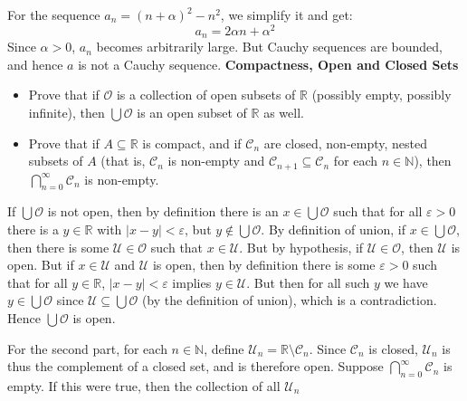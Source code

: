 \documentclass{article}
\begin{document}
    For the sequence $a_{n}=(n+\alpha)^{2}-n^{2}$, we simplify it and get:
    \begin{equation}
        a_{n}
        =
        2\alpha{n}+\alpha^{2}
    \end{equation}
    Since $\alpha>0$, $a_{n}$ becomes arbitrarily large. But Cauchy sequences
    are bounded, and hence $a$ is not a Cauchy sequence.
    \color{black}
    \newpage
    \textbf{Compactness, Open and Closed Sets}
    \begin{itemize}
        \item
            Prove that if $\mathcal{O}$ is a collection of open subsets of
            $\mathbb{R}$ (possibly empty, possibly infinite), then
            $\bigcup\mathcal{O}$ is an open subset of $\mathbb{R}$ as well.
        \item
            Prove that if $A\subseteq\mathbb{R}$ is compact, and if
            $\mathcal{C}_{n}$ are closed, non-empty, nested subsets of
            $A$ (that is, $\mathcal{C}_{n}$ is non-empty and
            $\mathcal{C}_{n+1}\subseteq\mathcal{C}_{n}$ for each
            $n\in\mathbb{N}$), then
            $\bigcap_{n=0}^{\infty}\mathcal{C}_{n}$ is non-empty.
    \end{itemize}
    \color{blue}
    If $\bigcup\mathcal{O}$ is not open, then by definition there is an
    $x\in\bigcup\mathcal{O}$ such that for all $\varepsilon>0$ there is a
    $y\in\mathbb{R}$ with $|x-y|<\varepsilon$, but $y\not\in\bigcup\mathcal{O}$.
    By definition of union, if $x\in\bigcup\mathcal{O}$, then there is some
    $\mathcal{U}\in\mathcal{O}$ such that $x\in\mathcal{U}$. But by
    hypothesis, if $\mathcal{U}\in\mathcal{O}$, then $\mathcal{U}$ is open.
    But if $x\in\mathcal{U}$ and $\mathcal{U}$ is open, then by definition
    there is some $\varepsilon>0$ such that for all $y\in\mathbb{R}$,
    $|x-y|<\varepsilon$ implies $y\in\mathcal{U}$. But then for all such
    $y$ we have $y\in\bigcup\mathcal{O}$ since
    $\mathcal{U}\subseteq\bigcup\mathcal{O}$ (by the definition of union),
    which is a contradiction. Hence $\bigcup\mathcal{O}$ is open.
    \par\hfill\par
    For the second part, for each $n\in\mathbb{N}$, define
    $\mathcal{U}_{n}=\mathbb{R}\setminus\mathcal{C}_{n}$.
    Since $\mathcal{C}_{n}$
    is closed, $\mathcal{U}_{n}$ is thus the complement of a closed set, and
    is therefore open. Suppose $\bigcap_{n=0}^{\infty}\mathcal{C}_{n}$ is
    empty. If this were true, then the collection of all $\mathcal{U}_{n}$
\end{document}
